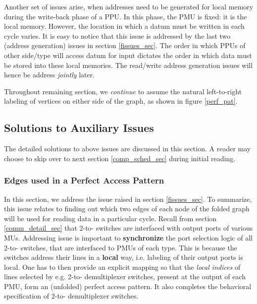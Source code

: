\documentclass[12pt]{article}
\begin{document}
Another set of issues arise, when addresses need to be generated
for local memory during the write-back phase of a PPU. In this
phase, the PMU is fixed: it is the local memory. However, the
location in which a datum must be written in each cycle varies. It is easy
to notice that this issue is addressed by the last two (address generation)
issues in section \ref{fissues_sec}. The order in which PPUs of other side/type will access datum for input dictates the order in
which data must be stored into these local memories. The read/write address generation
issues will hence be address \textit{jointly} later.

Throughout remaining section, we \textit{continue} to assume the
natural left-to-right labeling of vertices on either side of the
graph, as shown in figure \ref{perf_pat}.

\subsection{Solutions to Auxiliary Issues}
\label{aux_issue_sec}
The detailed solutions to above issues are discussed in this
section. A reader may choose to skip over to next section
\ref{comp_sched_sec} during initial reading.

\subsubsection{Edges used in a Perfect Access Pattern}
\label{edge_map_sec}
In this section, we address the  issue raised in section
\ref{fissues_sec}. To summarize, this issue relates to finding out which
two edges of each node of the folded graph will be used for reading data
in a particular cycle. Recall from section \ref{comm_detail_sec} that
2-to- switches are interfaced with output ports of various MUs.
Addressing  issue is important to \textbf{synchronize} the
port selection logic of all
2-to- switches, that are interfaced to PMUs of each
type.
This is because the switches address their lines in a \textbf{local} way,
i.e. labeling of their output ports is local. One has to then provide an explicit
mapping so that the \textit{local indices} of lines selected by e.g.
2-to- demultiplexer switches, present at the output of each PMU, form an (unfolded) perfect access pattern. It also
completes the behavioral specification of 2-to- demultiplexer
switches.
\end{document}
